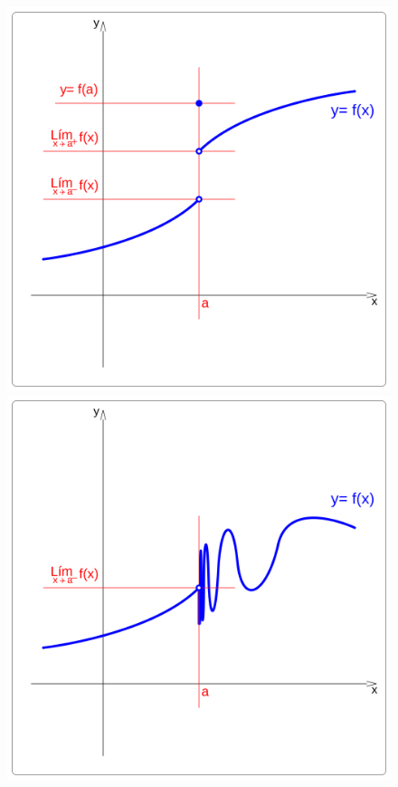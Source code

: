 \begin{figure}[hbp]
\includegraphics[scale=0.06]{img/Funs/2f2}
\includegraphics[scale=0.06]{img/Funs/2f3}

\end{figure}
